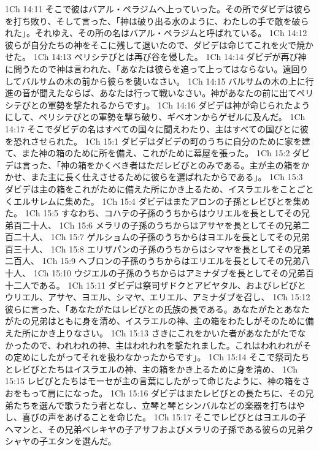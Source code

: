 1Ch 14:11  そこで彼はバアル・ペラジムへ上っていった。その所でダビデは彼らを打ち敗り、そして言った、「神は破り出る水のように、わたしの手で敵を破られた」。それゆえ、その所の名はバアル・ペラジムと呼ばれている。
1Ch 14:12  彼らが自分たちの神をそこに残して退いたので、ダビデは命じてこれを火で焼かせた。
1Ch 14:13  ペリシテびとは再び谷を侵した。
1Ch 14:14  ダビデが再び神に問うたので神は言われた、「あなたは彼らを追って上ってはならない。遠回りしてバルサムの木の前から彼らを襲いなさい。
1Ch 14:15  バルサムの木の上に行進の音が聞えたならば、あなたは行って戦いなさい。神があなたの前に出てペリシテびとの軍勢を撃たれるからです」。
1Ch 14:16  ダビデは神が命じられたようにして、ペリシテびとの軍勢を撃ち破り、ギベオンからゲゼルに及んだ。
1Ch 14:17  そこでダビデの名はすべての国々に聞えわたり、主はすべての国びとに彼を恐れさせられた。
1Ch 15:1  ダビデはダビデの町のうちに自分のために家を建て、また神の箱のために所を備え、これがために幕屋を張った。
1Ch 15:2  ダビデは言った、「神の箱をかくべき者はただレビびとのみである。主が主の箱をかかせ、また主に長く仕えさせるために彼らを選ばれたからである」。
1Ch 15:3  ダビデは主の箱をこれがために備えた所にかき上るため、イスラエルをことごとくエルサレムに集めた。
1Ch 15:4  ダビデはまたアロンの子孫とレビびとを集めた。
1Ch 15:5  すなわち、コハテの子孫のうちからはウリエルを長としてその兄弟百二十人、
1Ch 15:6  メラリの子孫のうちからはアサヤを長としてその兄弟二百二十人、
1Ch 15:7  ゲルショムの子孫のうちからはヨエルを長としてその兄弟百三十人、
1Ch 15:8  エリザパンの子孫のうちからはシマヤを長としてその兄弟二百人、
1Ch 15:9  ヘブロンの子孫のうちからはエリエルを長としてその兄弟八十人、
1Ch 15:10  ウジエルの子孫のうちからはアミナダブを長としてその兄弟百十二人である。
1Ch 15:11  ダビデは祭司ザドクとアビヤタル、およびレビびとウリエル、アサヤ、ヨエル、シマヤ、エリエル、アミナダブを召し、
1Ch 15:12  彼らに言った、「あなたがたはレビびとの氏族の長である。あなたがたとあなたがたの兄弟はともに身を清め、イスラエルの神、主の箱をわたしがそのために備えた所にかき上りなさい。
1Ch 15:13  さきにこれをかいた者があなたがたでなかったので、われわれの神、主はわれわれを撃たれました。これはわれわれがその定めにしたがってそれを扱わなかったからです」。
1Ch 15:14  そこで祭司たちとレビびとたちはイスラエルの神、主の箱をかき上るために身を清め、
1Ch 15:15  レビびとたちはモーセが主の言葉にしたがって命じたように、神の箱をさおをもって肩にになった。
1Ch 15:16  ダビデはまたレビびとの長たちに、その兄弟たちを選んで歌うたう者となし、立琴と琴とシンバルなどの楽器を打ちはやし、喜びの声をあげることを命じた。
1Ch 15:17  そこでレビびとはヨエルの子ヘマンと、その兄弟ベレキヤの子アサフおよびメラリの子孫である彼らの兄弟クシャヤの子エタンを選んだ。
